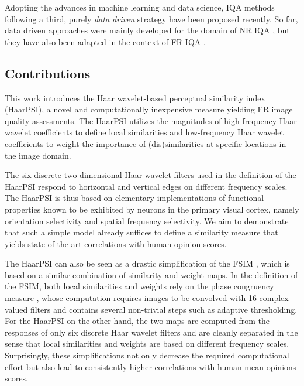 \documentclass[11pt,a4paper]{article}
\begin{document}
Adopting the advances in machine learning and data science, IQA methods
following a third, purely \textit{data driven} strategy have been proposed
recently. So far, data driven approaches were mainly developed for the domain of
NR IQA \cite{Kang2014,Ye2012,Zhang2015,bosse2016dnnNrIqa}, but they have also
been adapted in the context of FR IQA \cite{bosse2016dnnFrIqa}.   



\subsection{Contributions}

This work introduces the Haar wavelet-based perceptual similarity index
(HaarPSI), a novel and computationally inexpensive measure yielding FR image
quality assessments. The HaarPSI utilizes the magnitudes of high-frequency Haar wavelet coefficients to define local similarities and low-frequency Haar wavelet coefficients to weight the importance of (dis)similarities at specific locations in the image domain.

{The six discrete two-dimensional Haar wavelet filters used in the definition of the HaarPSI respond to horizontal and vertical edges on different frequency scales. The HaarPSI is thus based on elementary implementations of functional properties known to be exhibited by neurons in the primary visual cortex, namely orientation selectivity and spatial frequency selectivity. We aim to demonstrate that such a simple model already suffices to define a similarity measure that yields state-of-the-art correlations with human opinion scores.}

The HaarPSI can also be seen as a drastic simplification of the FSIM \cite{ZZMZ2011}, which is based on a similar combination of similarity and weight maps. In the definition of the FSIM, both local similarities and weights rely on the phase congruency measure \cite{Kov2000}, whose computation requires images to be convolved with 16 complex-valued filters and contains several non-trivial steps such as adaptive thresholding. For the HaarPSI on the other hand, the two maps are computed from the responses of only six discrete Haar wavelet filters and are cleanly separated in the sense that local similarities and weights are based on different frequency scales. Surprisingly, these simplifications not only decrease the required computational effort but also lead to consistently higher correlations with human mean opinions scores.
\end{document}
